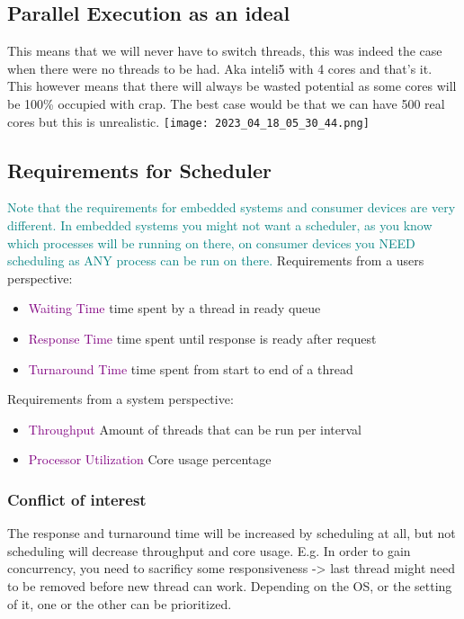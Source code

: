 \documentclass[main.tex,fontsize=8pt,paper=a4,paper=portrait,DIV=calc,]{scrartcl}
\begin{document}
\subsection{Parallel Execution as an ideal}
This means that we will never have to switch threads, this was indeed the case when there were no threads to be had.\newline
Aka inteli5 with 4 cores and that's it. This however means that there will always be wasted potential as some cores will be 100\% occupied with crap.\newline
The best case would be that we can have 500 real cores but this is unrealistic.\newline
\texttt{[image: 2023\_04\_18\_05\_30\_44.png]}

\subsection{Requirements for Scheduler}
\textcolor{teal}{Note that the requirements for embedded systems and consumer devices are very different.\newline
In embedded systems you might not want a scheduler, as you know which processes will be running on there, on consumer devices you NEED scheduling as ANY process can be run on there.}\newline
Requirements from a users perspective:
\begin{itemize}
\item \textcolor{purple}{Waiting Time}\newline
  time spent by a thread in ready queue
\item \textcolor{purple}{Response Time}\newline
  time spent until response is ready after request
\item \textcolor{purple}{Turnaround Time}\newline
  time spent from start to end of a thread
\end{itemize} 
Requirements from a system perspective:
\begin{itemize}
\item \textcolor{purple}{Throughput}\newline
  Amount of threads that can be run per interval
\item \textcolor{purple}{Processor Utilization}\newline
  Core usage percentage
\end{itemize} 

\subsubsection{Conflict of interest}
The response and turnaround time will be increased by scheduling at all, but not scheduling will decrease throughput and core usage.\newline
E.g. In order to gain concurrency, you need to sacrificy some responsiveness -> last thread might need to be removed before new thread can work.\newline
Depending on the OS, or the setting of it, one or the other can be prioritized.
\end{document}
